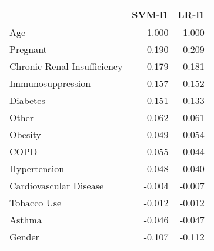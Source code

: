 \begin{tabular}{lrr}
\toprule
{} &  SVM-l1 &  LR-l1 \\
\midrule
Age                         &   1.000 &  1.000 \\
Pregnant                    &   0.190 &  0.209 \\
Chronic Renal Insufficiency &   0.179 &  0.181 \\
Immunosuppression           &   0.157 &  0.152 \\
Diabetes                    &   0.151 &  0.133 \\
Other                       &   0.062 &  0.061 \\
Obesity                     &   0.049 &  0.054 \\
COPD                        &   0.055 &  0.044 \\
Hypertension                &   0.048 &  0.040 \\
Cardiovascular Disease      &  -0.004 & -0.007 \\
Tobacco Use                 &  -0.012 & -0.012 \\
Asthma                      &  -0.046 & -0.047 \\
Gender                      &  -0.107 & -0.112 \\
\bottomrule
\end{tabular}
